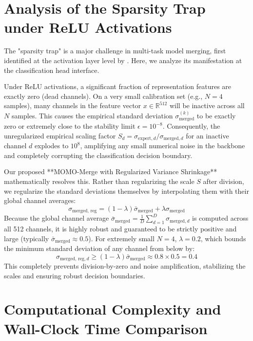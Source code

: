 \documentclass{article}
\theoremstyle{plain}
\theoremstyle{definition}
\theoremstyle{remark}
\begin{document}
\section{Analysis of the Sparsity Trap under ReLU Activations}
\label{app:sparsity_trap}

The "sparsity trap" is a major challenge in multi-task model merging, first identified at the activation layer level by \citet{SPTAAC26}. Here, we analyze its manifestation at the classification head interface.

Under ReLU activations, a significant fraction of representation features are exactly zero (dead channels). On a very small calibration set (e.g., $N=4$ samples), many channels in the feature vector $x \in \mathbb{R}^{512}$ will be inactive across all $N$ samples. This causes the empirical standard deviation $\sigma_{\text{merged}}^{(k)}$ to be exactly zero or extremely close to the stability limit $\epsilon = 10^{-8}$.
Consequently, the unregularized empirical scaling factor $S_d = \sigma_{\text{expert}, d} / \sigma_{\text{merged}, d}$ for an inactive channel $d$ explodes to $10^{8}$, amplifying any small numerical noise in the backbone and completely corrupting the classification decision boundary.

Our proposed **MOMO-Merge with Regularized Variance Shrinkage** mathematically resolves this.
Rather than regularizing the scale $S$ after division, we regularize the standard deviations themselves by interpolating them with their global channel averages:
\begin{equation}
\sigma_{\text{merged, reg}} = (1 - \lambda) \bar{\sigma}_{\text{merged}} + \lambda \sigma_{\text{merged}}
\end{equation}
Because the global channel average $\bar{\sigma}_{\text{merged}} = \frac{1}{D}\sum_{d=1}^D \sigma_{\text{merged}, d}$ is computed across all 512 channels, it is highly robust and guaranteed to be strictly positive and large (typically $\bar{\sigma}_{\text{merged}} \approx 0.5$).
For extremely small $N=4$, $\lambda = 0.2$, which bounds the minimum standard deviation of any channel from below by:
\begin{equation}
\sigma_{\text{merged, reg}, d} \ge (1 - \lambda) \bar{\sigma}_{\text{merged}} \approx 0.8 \times 0.5 = 0.4
\end{equation}
This completely prevents division-by-zero and noise amplification, stabilizing the scales and ensuring robust decision boundaries.

\section{Computational Complexity and Wall-Clock Time Comparison}
\label{app:complexity}
\end{document}

